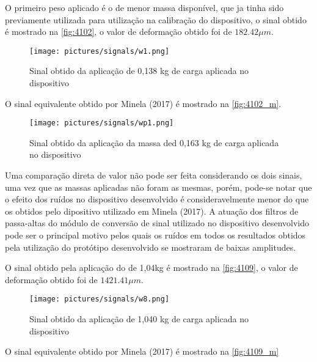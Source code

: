 O primeiro peso aplicado é o de menor massa disponível, que ja tinha sido previamente utilizada para utilização na calibração do dispositivo,
o sinal obtido é mostrado na \autoref{fig:4102}, o valor de deformação obtido foi de $ 182.42 {\mu}m $.

\begin{figure}[H]
	\caption{\label{fig:4102} Sinal obtido da aplicação de 0,138 kg de carga aplicada no dispositivo}
	\begin{center}
		\texttt{[image: pictures/signals/w1.png]}
	\end{center}
\end{figure}

O sinal equivalente obtido por Minela (2017) é mostrado na \autoref{fig:4102_m}.

\begin{figure}[H]
	\caption{\label{fig:4102_m} Sinal obtido da aplicação da massa ded 0,163 kg de carga aplicada no dispositivo}
	\begin{center}
		\texttt{[image: pictures/signals/wp1.png]}
	\end{center}
\end{figure}

Uma comparação direta de valor não pode ser feita considerando os dois sinais, uma vez que as massas aplicadas não foram as mesmas, porém,
pode-se notar que o efeito dos ruídos no dispositivo desenvolvido é consideravelmente menor do que os obtidos pelo dipositivo utilizado em Minela (2017).
A atuação dos filtros de passa-altas do módulo de conversão de sinal utilizado no dispositivo desenvolvido pode ser o principal motivo pelos quais os ruídos em
todos os resultados obtidos pela utilização do protótipo desenvolvido se mostraram de baixas amplitudes.

O sinal obtido pela aplicação do de 1,04kg é mostrado na \autoref{fig:4109}, o valor de deformação obtido foi de $ 1421.41 {\mu}m $.

\begin{figure}[H]
	\caption{\label{fig:4109} Sinal obtido da aplicação de 1,040 kg de carga aplicada no dispositivo}
	\begin{center}
		\texttt{[image: pictures/signals/w8.png]}
	\end{center}
\end{figure}

O sinal equivalente obtido por Minela (2017) é mostrado na \autoref{fig:4109_m}

